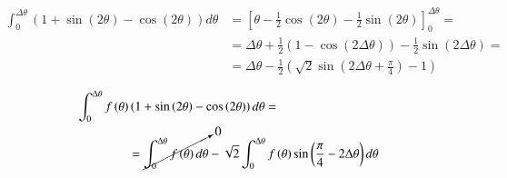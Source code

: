 \documentclass[review]{elsarticle}
\begin{document}
\begin{equation}
\begin{aligned}
\int_{0}^{\Delta\theta}\left(1+\sin\left(2\theta\right)-\cos\left(2\theta\right)\right)d\theta&=\left[\theta-\frac{1}{2}\cos\left(2\theta\right)-\frac{1}{2}\sin\left(2\theta\right)\right]_{0}^{\Delta\theta}=\\
&=\Delta\theta+\frac{1}{2}\left(1-\cos\left(2\Delta\theta\right)\right)-\frac{1}{2}\sin\left(2\Delta\theta\right)=\\
&=\Delta\theta-\frac{1}{2}\left(\sqrt{2}\sin\left(2\Delta\theta+\frac{\pi}{4}\right)-1\right)
\end{aligned}
\end{equation}

\begin{equation}
\begin{aligned}
\int_{0}^{\Delta\theta}f\left(\theta\right)&\left(1+\sin\left(2\theta\right)-\cos\left(2\theta\right)\right)d\theta=\\&=\cancelto{0}{\int_{0}^{\Delta\theta}f\left(\theta\right)d\theta}-\sqrt{2}\int_{0}^{\Delta\theta}f\left(\theta\right)\sin\left(\frac{\pi}{4}-2\Delta\theta\right)d\theta
\end{aligned}
\end{equation}
\end{document}
